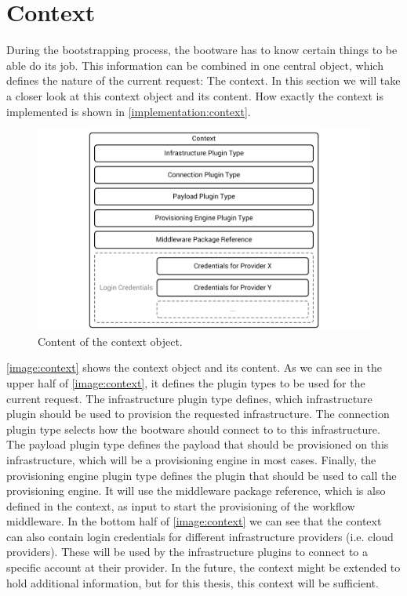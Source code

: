 \section{Context}
\label{design:context}

During the bootstrapping process, the bootware has to know certain things to be able do its job.
This information can be combined in one central object, which defines the nature of the current request: The context.
In this section we will take a closer look at this context object and its content.
How exactly the context is implemented is shown in \autoref{implementation:context}.

\begin{figure}[!htbp]
	\centering
	\includegraphics[resolution=600]{design/assets/context}
	\caption{Content of the context object.}
	\label{image:context}
\end{figure}

\autoref{image:context} shows the context object and its content.
As we can see in the upper half of \autoref{image:context}, it defines the plugin types to be used for the current request.
The infrastructure plugin type defines, which infrastructure plugin should be used to provision the requested infrastructure.
The connection plugin type selects how the bootware should connect to to this infrastructure.
The payload plugin type defines the payload that should be provisioned on this infrastructure, which will be a provisioning engine in most cases.
Finally, the provisioning engine plugin type defines the plugin that should be used to call the provisioning engine.
It will use the middleware package reference, which is also defined in the context, as input to start the provisioning of the workflow middleware.
In the bottom half of \autoref{image:context} we can see that the context can also contain login credentials for different infrastructure providers (i.e. cloud providers).
These will be used by the infrastructure plugins to connect to a specific account at their provider.
In the future, the context might be extended to hold additional information, but for this thesis, this context will be sufficient.

